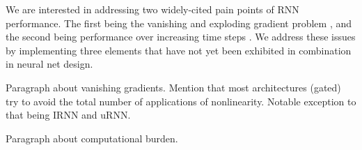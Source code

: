\documentclass{article}
\begin{document}
We are interested in addressing two widely-cited pain points of RNN performance.  The first being the vanishing and exploding gradient problem \citep{pascanu2013difficulty, bengio2013advances, pascanu2012understanding}, and the second being performance over increasing time steps \citep{Gers2000, hoch97}.  We address these issues by implementing three elements that have not yet been exhibited in combination in neural net design. 


Paragraph about vanishing gradients. Mention that most architectures (gated) try to avoid the total number of applications of nonlinearity. Notable exception to that being IRNN and uRNN.

Paragraph about computational burden.


%
%
%
\end{document}

